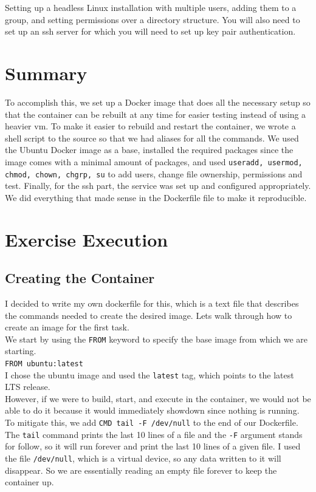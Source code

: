 \documentclass[a4paper]{article}
\begin{document}
Setting up a headless Linux installation with multiple users, adding them to a group, and setting permissions over a directory structure. You will also need to set up an ssh server for which you will need to set up key pair authentication.


\section{Summary}

To accomplish this, we set up a Docker image that does all the necessary setup so that the container can be rebuilt at any time for easier testing instead of using a heavier vm. To make it easier to rebuild and restart the container, we wrote a shell script to the source so that we had aliases for all the commands. We used the Ubuntu Docker image as a base, installed the required packages since the image comes with a minimal amount of packages, and used \texttt{useradd, usermod, chmod, chown, chgrp, su} to add users, change file ownership, permissions and test. Finally, for the ssh part, the service was set up and configured appropriately. We did everything that made sense in the Dockerfile file to make it reproducible. 


\newpage

\section{Exercise Execution}

\subsection{Creating the Container}

I decided to write my own dockerfile for this, which is a text file that describes the commands needed to create the desired image. Lets walk through how to create an image for the first task. \\
We start by using the \texttt{FROM} keyword to specify the base image \cite{docker-glossary} from which we are starting.
\\
\texttt{FROM ubuntu:latest} \\
I chose the ubuntu image \cite{ubuntu} and used the \texttt{latest} tag, which points to the latest LTS release.\\
However, if we were to build, start, and execute in the container, we would not be able to do it because it would immediately showdown since nothing is running. \\
To mitigate this, we add \texttt{CMD tail -F /dev/null} to the end of our Dockerfile. The \texttt{tail} command prints the last 10 lines of a file and the \texttt{-F} argument stands for follow, so it will run forever and print the last 10 lines of a given file.\cite{tail} I used the file \texttt{/dev/null}, which is a virtual device, so any data written to it will disappear. \cite{devnull} So we are essentially reading an empty file forever to keep the container up. \\
\end{document}

